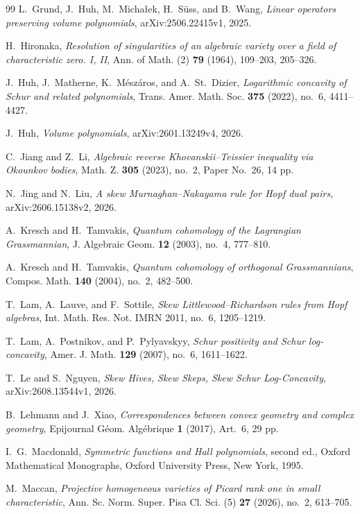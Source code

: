 \documentclass[11pt,a4paper,oneside]{amsart}
\numberwithin{equation}{section}
\theoremstyle{definition}
\theoremstyle{remark}
\begin{document}
\begin{thebibliography}{99}
L.~Grund, J.~Huh, M.~Micha\l ek, H.~S\"uss, and B.~Wang,
\emph{Linear operators preserving volume polynomials},
arXiv:2506.22415v1, 2025.

H.~Hironaka,
\emph{Resolution of singularities of an algebraic variety over a field of characteristic zero. I, II},
Ann. of Math. (2) \textbf{79} (1964), 109--203, 205--326.

J.~Huh, J.~Matherne, K.~M\'esz\'aros, and A.~St.~Dizier,
\emph{Logarithmic concavity of Schur and related polynomials},
Trans. Amer. Math. Soc. \textbf{375} (2022), no.~6, 4411--4427.

J.~Huh,
\emph{Volume polynomials},
arXiv:2601.13249v4, 2026.

C.~Jiang and Z.~Li,
\emph{Algebraic reverse Khovanskii--Teissier inequality via Okounkov bodies},
Math. Z. \textbf{305} (2023), no.~2, Paper No.~26, 14 pp.

N.~Jing and N.~Liu,
\emph{A skew Murnaghan--Nakayama rule for Hopf dual pairs},
arXiv:2606.15138v2, 2026.

A.~Kresch and H.~Tamvakis,
\emph{Quantum cohomology of the Lagrangian Grassmannian},
J. Algebraic Geom. \textbf{12} (2003), no.~4, 777--810.

A.~Kresch and H.~Tamvakis,
\emph{Quantum cohomology of orthogonal Grassmannians},
Compos. Math. \textbf{140} (2004), no.~2, 482--500.

T.~Lam, A.~Lauve, and F.~Sottile,
\emph{Skew Littlewood--Richardson rules from Hopf algebras},
Int. Math. Res. Not. IMRN 2011, no.~6, 1205--1219.

T.~Lam, A.~Postnikov, and P.~Pylyavskyy,
\emph{Schur positivity and Schur log-concavity},
Amer. J. Math. \textbf{129} (2007), no.~6, 1611--1622.

T.~Le and S.~Nguyen,
\emph{Skew Hives, Skew Skeps, Skew Schur Log-Concavity},
arXiv:2608.13544v1, 2026.

B.~Lehmann and J.~Xiao,
\emph{Correspondences between convex geometry and complex geometry},
Epijournal G\'eom. Alg\'ebrique \textbf{1} (2017), Art.~6, 29 pp.

I.~G.~Macdonald,
\emph{Symmetric functions and Hall polynomials}, second ed.,
Oxford Mathematical Monographs, Oxford University Press, New York, 1995.

M.~Maccan,
\emph{Projective homogeneous varieties of Picard rank one in small characteristic},
Ann. Sc. Norm. Super. Pisa Cl. Sci. (5) \textbf{27} (2026), no.~2, 613--705.


\end{thebibliography}
\end{document}
